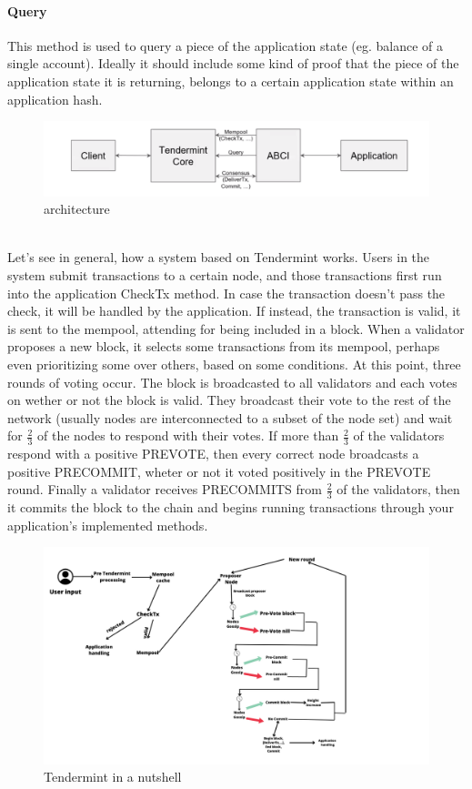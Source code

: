 \documentclass{article}
\begin{document}
	\paragraph{Query}
	This method is used to query a piece of the application state (eg. balance of a single account). Ideally it should include some kind of proof that the piece of the application state it is returning, belongs to a certain application state within an application hash. \\
	\begin{figure}[htbp]
    \centering
    \includegraphics[width=1\textwidth]{im1} 
    \caption{architecture}
	\end{figure}\\
    Let's see in general, how a system based on Tendermint works. Users in the system submit transactions to a certain node, and those transactions first run into the application CheckTx method. In case the transaction doesn't pass the check, it will be handled by the application. If instead, the transaction is valid, it is sent to the mempool, attending for being included in a block. When a validator proposes a new block, it selects some transactions from its mempool, perhaps even prioritizing some over others, based on some conditions. At this point, three rounds of voting occur. The block is broadcasted to all validators and each votes on wether or not the block is valid. They broadcast their vote to the rest of the network (usually nodes are interconnected to a subset of the node set) and wait for $\frac{2}{3}$ of the nodes to respond with their votes. If more than $\frac{2}{3}$ of the validators respond with a positive PREVOTE, then every correct node broadcasts a positive PRECOMMIT, wheter or not it voted positively in the PREVOTE round. Finally a validator receives PRECOMMITS from $\frac{2}{3}$ of the validators, then it commits the block to the chain and begins running transactions through your application's implemented methods.
	\begin{figure}[htbp]
    \centering
    \includegraphics[width=1\textwidth]{Userinput} 
	\caption{Tendermint in a nutshell}
	\end{figure}\\
\newpage
\end{document}
